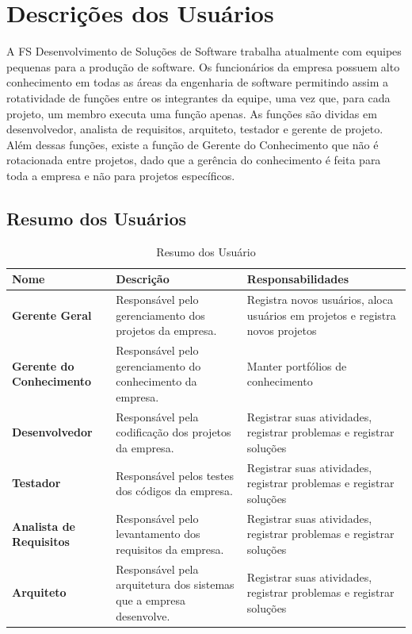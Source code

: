 \section{Descrições dos Usuários}
A FS Desenvolvimento de Soluções de Software trabalha atualmente com equipes pequenas para a produção de software. Os funcionários da empresa possuem alto conhecimento em todas as áreas da engenharia de software permitindo assim a rotatividade de funções entre os integrantes da equipe, uma vez que, para cada projeto, um membro executa uma função apenas. As funções são dividas em desenvolvedor, analista de requisitos, arquiteto, testador e gerente de projeto. Além dessas funções, existe a função de Gerente do Conhecimento que não é rotacionada entre projetos, dado que a gerência do conhecimento é feita para toda a empresa e não para projetos específicos.

\subsection{Resumo dos Usuários}

\begin{table}[H]
\caption{Resumo dos Usuário}
\centering
\begin{tabular}{ | p{3cm} | p{5cm}| p{5cm} | }
\hline
\textbf{Nome} & Descrição & Responsabilidades \\ \hline
\textbf{Gerente Geral} & Responsável pelo gerenciamento dos projetos da empresa. & Registra novos usuários, aloca usuários em projetos e registra novos projetos \\ \hline
\textbf{Gerente do Conhecimento} & Responsável pelo gerenciamento do conhecimento da empresa. & Manter portfólios de conhecimento \\ \hline
\textbf{Desenvolvedor} & Responsável pela codificação dos projetos da empresa. & Registrar suas atividades, registrar problemas e registrar soluções \\ \hline
\textbf{Testador} & Responsável pelos testes dos códigos da empresa. & Registrar suas atividades, registrar problemas e registrar soluções \\ \hline
\textbf{Analista de Requisitos} & Responsável pelo levantamento dos requisitos da empresa. & Registrar suas atividades, registrar problemas e registrar soluções \\ \hline
\textbf{Arquiteto} & Responsável pela arquitetura dos sistemas que a empresa desenvolve. & Registrar suas atividades, registrar problemas e registrar soluções \\ \hline
\end{tabular}
\end{table}

